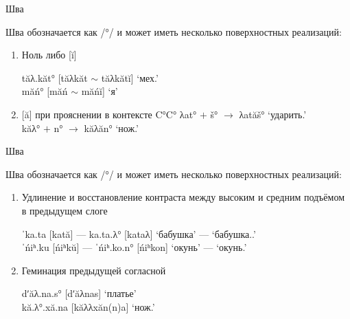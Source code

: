 \documentclass[10 pt, handout]{beamer}
\begin{document}
\begin{frame}{Шва} 

	Шва обозначается как /°/ и может иметь несколько поверхностных реализаций:
	\vspace*{1em}

	\begin{enumerate}[\ding{246}]
		\item Ноль либо [ĭ]
		
	\ex	tăλ.kăt° [tăλkăt $\sim$ tăλkătĭ] \hfill `мех.{\Abl}'\\
		măń° [măń $\sim$ măńĭ]  \hfill `я'
	\xe
		
		\item {[ă]} при прояснении в контексте C°C°
	\ex	λat° $+$ š° $\rightarrow$ λatăš° \hfill `ударить.{\Cvb}'\\
		kăλ° $+$ n° $\rightarrow$ kăλăn° \hfill `нож.{\Dat}'
	\xe
		
	\end{enumerate}

\end{frame}

\begin{frame}{Шва} 

	Шва обозначается как /°/ и может иметь несколько поверхностных реализаций:
	\vspace*{1em}

	\begin{enumerate}[\ding{117}]
		\item Удлинение и восстановление контраста между высоким и средним подъёмом в предыдущем слоге	

	\ex	ˈka.ta [kată] --- ka.ta.λ° [kataλ] \hfill `бабушка' --- `бабушка.{\Poss}.{\Ssg}'\\
		ˈńiʰ.ku [ńiʰkŭ] --- ˈńiʰ.ko.n° [ńiʰkon] \hfill `окунь' --- `окунь.{\Dat}' 
	\xe
		
		\item Геминация предыдущей согласной
			
	\ex dʹăλ.na.s° [dʹăλnas] \hfill `платье'\\
		kă.λ°.xă.na [kăλλxăn(n)a] \hfill `нож.{\Loc}'
	\xe
	\end{enumerate}

\end{frame}
\end{document}
